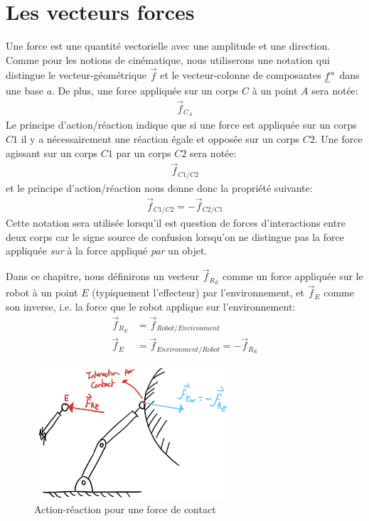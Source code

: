 \section{Les vecteurs forces}
\label{sec:force}

Une force est une quantité vectorielle avec une amplitude et une direction. Comme pour les notions de cinématique, nous utiliserons une notation qui distingue le vecteur-géométrique $\Vec{f}$ et le vecteur-colonne de composantes $\underline{f}^a$ dans une base $a$. De plus, une force appliquée sur un corps $C$ à un point $A$ sera notée: 
\begin{align}
\vec{f}_{C_A}
\end{align}
Le principe d'action/réaction indique que si une force est appliquée sur un corps $C1$ il y a nécessairement une réaction égale et opposée sur un corps $C2$. Une force agissant sur un corps $C1$ par un corps $C2$ sera notée:
\begin{align}
\vec{f}_{C1/C2}
\end{align}
et le principe d'action/réaction nous donne donc la propriété suivante:
\begin{align}
\vec{f}_{C1/C2} = - \vec{f}_{C2/C1}
\end{align}
Cette notation sera utilisée lorsqu'il est question de forces d'interactions entre deux corps car le signe source de confusion lorsqu'on ne distingue pas la force appliquée \textit{sur} à la force appliqué \textit{par} un objet.

Dans ce chapitre, nous définirons un vecteur $\vec{f}_{R_E}$ comme un force appliquée sur le robot à un point $E$ (typiquement l'effecteur) par l'environnement, et $\vec{f}_{E}$ comme son inverse, i.e. la force que le robot applique sur l'environnement:
\begin{align}
\vec{f}_{R_E} &=\vec{f}_{Robot/Environment} \\
\vec{f}_{E}   &=\vec{f}_{Environment/Robot} = -\vec{f}_{R_E}
\label{eq:contactforcenotation}
\end{align}

\begin{figure}[H]
	\centering
		\includegraphics[width=0.65\textwidth]{fig/force_ext_contact.jpg}
	\caption{Action-réaction pour une force de contact}
	\label{fig:contactforce}
\end{figure}


